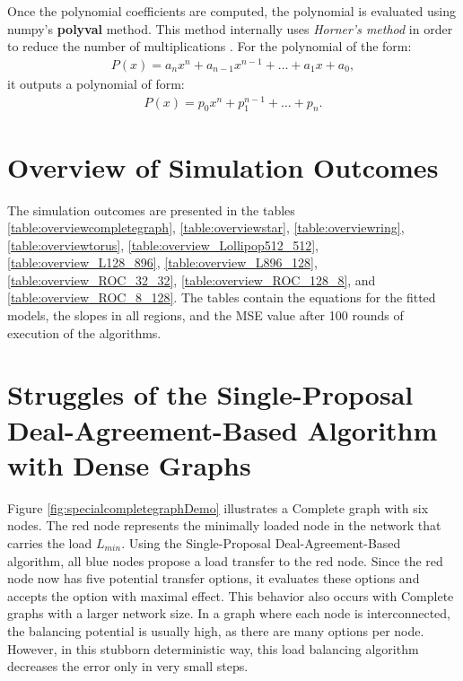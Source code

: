 Once the polynomial coefficients are computed, the polynomial is evaluated using numpy's \textbf{polyval} method. This method internally uses \textit{Horner's method} in order to reduce the number of multiplications \cite{NumPyPolyVal}. For the polynomial of the form:
\begin{align}
    P(x) = a_{n}x^{n}+a_{n-1}x^{n-1}+ \dots + a_{1}x+a_{0},
\end{align}
it outputs a polynomial of form:
\begin{align}
    P(x)=p_{0}x^{n}+p_{1}^{n-1}+\dots + p_{n}.
\end{align}
\cite{wolfram_horner}

\section{Overview of Simulation Outcomes}\label{sec:overviewSimOutcomes}
The simulation outcomes are presented in the tables \ref{table:overviewcompletegraph}, \ref{table:overviewstar}, \ref{table:overviewring}, \ref{table:overviewtorus}, \ref{table:overview_Lollipop512_512}, \ref{table:overview_L128_896}, \ref{table:overview_L896_128}, \ref{table:overview_ROC_32_32}, \ref{table:overview_ROC_128_8}, and \ref{table:overview_ROC_8_128}. The tables contain the equations for the fitted models, the slopes in all regions, and the MSE value after 100 rounds of execution of the algorithms.













\section{Struggles of the Single-Proposal Deal-Agreement-Based Algorithm with Dense Graphs}\label{sec:struggleDAB}
Figure \ref{fig:specialcompletegraphDemo} illustrates a Complete graph with six nodes. The red node represents the minimally loaded node in the network that carries the load $L_{min}$. Using the Single-Proposal Deal-Agreement-Based algorithm, all blue nodes propose a load transfer to the red node. Since the red node now has five potential transfer options, it evaluates these options and accepts the option with maximal effect. This behavior also occurs with Complete graphs with a larger network size. In a graph where each node is interconnected, the balancing potential is usually high, as there are many options per node. However, in this stubborn deterministic way, this load balancing algorithm decreases the error only in very small steps.

